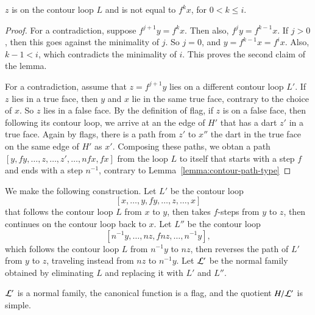 \begin{lemma}  $z$ is on the contour loop $L$ and is not equal to $f^k x$, for $0 < k \le i$.
\end{lemma}

\begin{proof} 
For a contradiction, suppose $f^{j+1} y = f^k x$. Then also, $f^j y = f^{k-1} x$.  If $j>0$, then this goes against the minimality of $j$.  So $j=0$, and $y=f^{k-1} x = f^i x$.  Also, $k-1 < i$, which contradicts the minimality of $i$.  This proves the second claim of the lemma.

For a contradiction, assume that $z = f^{j+1} y$ lies on a different contour loop $L'$.  If $z$ lies in a true face, then $y$ and $x$ lie in the same true face, contrary to the choice of $x$.  So $z$ lies in a false face.  By the definition of flag, if $z$ is on a false face, then following its contour loop, we arrive at an the edge of $H'$ that has a dart $z'$ in a true face. Again by flags, there is a path from $z'$ to $x''$ the dart in the true face on the same edge of $H'$ as $x'$.  Composing these paths, we obtan a path $[y,f y,\ldots,z,\ldots,z',\ldots,n f x,f x]$ from the loop $L$ to itself that starts with a step $f$ and ends with a step $n^{-1}$, contrary to Lemma~\ref{lemma:contour-path-type}
\end{proof}


We make the following construction.  Let $L'$ be the contour loop
$$
[x,\ldots,y,f y,\ldots,z,\ldots,x]
$$
that follows the contour loop $L$ from $x$ to $y$, then takes $f$-steps from $y$ to $z$, then continues on the contour loop back to $x$.
Let $L''$ be the contour loop
$$
[n^{-1} y,\ldots,n z,f n z,\ldots,n^{-1}y],
$$
which follows the contour loop $L$ from $n^{-1} y$ to $n z$, then reverses the path of $L'$ from $y$ to $z$, traveling instead from $n z$ to $n^{-1} y$. Let ${\cal L'}$ be the normal family obtained by eliminating $L$ and replacing it with $L'$ and $L''$.

\begin{lemma}  
${\cal L'}$ is a normal family, the canonical function is a flag, and the quotient $H/{\cal L'}$ is simple.
\end{lemma}

